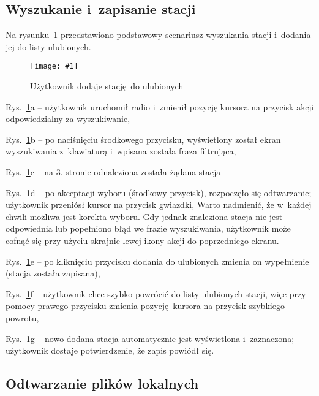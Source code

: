 \documentclass[polish]{aghengthesis}
\let\tempone\itemize
\let\temptwo\enditemize
\renewenvironment{itemize}{\tempone\setlength{\itemsep}{0cm}}{\temptwo}
\newcommand{\imgint}[4]{
	\begin{figure}[{#4}]
		\centering
		\texttt{[image: \#1]}
		\caption{#2}
		\label{#1}
	\end{figure}
}
\newcommand{\imgh}[3]{\imgint{#1}{#2}{#3}{H}}
\begin{document}
		\subsection{Wyszukanie i~zapisanie stacji}
			\newcommand{\rfladd}[1]{\ref{5/PicoRadio-fl-add}#1}
			
			Na rysunku~\rfladd{} przedstawiono podstawowy scenariusz wyszukania stacji i~dodania jej do listy ulubionych.
			
			\imgh{5/PicoRadio-fl-add}{Użytkownik dodaje stację do ulubionych}{0.9}
			
			\begin{itemize}
				\item Rys.~\rfladd{a} -- użytkownik uruchomił radio i~zmienił pozycję kursora na przycisk akcji odpowiedzialny za wyszukiwanie,
				\item Rys.~\rfladd{b} -- po naciśnięciu środkowego przycisku, wyświetlony został ekran wyszukiwania z~klawiaturą i~wpisana została fraza filtrująca,
				\item Rys.~\rfladd{c} -- na 3. stronie odnaleziona została żądana stacja
				\item Rys.~\rfladd{d} -- po akceptacji wyboru (środkowy przycisk), rozpoczęło się odtwarzanie; użytkownik przeniósł kursor na przycisk gwiazdki,
			\end{itemize}
			Warto nadmienić, że w~każdej chwili możliwa jest korekta wyboru. Gdy jednak znaleziona stacja nie jest odpowiednia lub popełniono błąd we frazie wyszukiwania, użytkownik może cofnąć się przy użyciu skrajnie lewej ikony akcji do poprzedniego ekranu.
			\begin{itemize}
				\item Rys.~\rfladd{e} -- po kliknięciu przycisku dodania do ulubionych zmienia on wypełnienie (stacja została zapisana),
				\item Rys.~\rfladd{f} -- użytkownik chce szybko powrócić do listy ulubionych stacji, więc przy pomocy prawego przycisku zmienia pozycję kursora na przycisk szybkiego powrotu,
				\item Rys.~\rfladd{g} -- nowo dodana stacja automatycznie jest wyświetlona i~zaznaczona; użytkownik dostaje potwierdzenie, że zapis powiódł się.
			\end{itemize}
			
		\subsection{Odtwarzanie plików lokalnych}
			\newcommand{\rflocal}[1]{\ref{5/PicoRadio-fl-local}#1}
			
\end{document}
